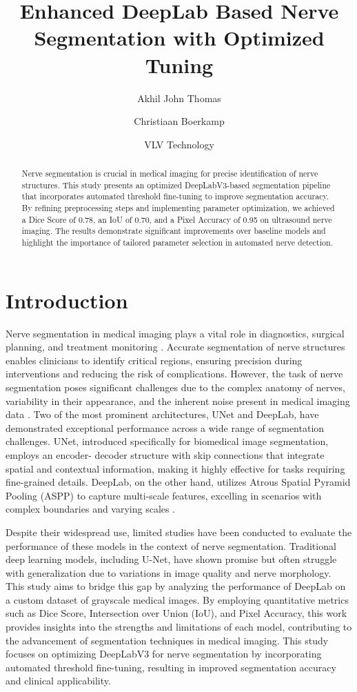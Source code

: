 \documentclass{article}
\title{Enhanced DeepLab Based Nerve Segmentation with Optimized Tuning}
\author{Akhil John Thomas \and  Christiaan Boerkamp}
\date{VLV Technology}
\begin{document}
\maketitle

\begin{abstract}
Nerve segmentation is crucial in medical imaging for precise identification of nerve structures. This study presents an optimized DeepLabV3-based segmentation pipeline that incorporates automated threshold fine-tuning to improve segmentation accuracy. By refining preprocessing steps and implementing parameter optimization, we achieved a Dice Score of 0.78, an IoU of 0.70, and a Pixel Accuracy of 0.95 on ultrasound nerve imaging. The results demonstrate significant improvements over baseline models and highlight the importance of tailored parameter selection in automated nerve detection.
\end{abstract}


\section{Introduction}

Nerve segmentation in medical imaging plays a vital role in diagnostics, surgical planning, and treatment monitoring \cite{egger2012medical}. Accurate segmentation of nerve structures enables clinicians to identify critical regions, ensuring precision during interventions and reducing the risk of complications. However, the task of nerve segmentation poses significant challenges due to the complex anatomy of nerves, variability in their appearance, and the inherent noise present in medical imaging data \cite{ronneberger2015u}\cite{milletari2016v}. Two of the most prominent architectures, UNet and DeepLab, have demonstrated
exceptional performance across a wide range of segmentation challenges. UNet,
introduced specifically for biomedical image segmentation, employs an encoder-
decoder structure with skip connections that integrate spatial and contextual information, making it highly effective for tasks requiring fine-grained details.
DeepLab, on the other hand, utilizes Atrous Spatial Pyramid Pooling (ASPP) to capture multi-scale features, excelling in scenarios with complex boundaries and varying scales \cite{chen2018encoder}.


Despite their widespread use, limited studies have been conducted to evaluate the performance of these models in the context of nerve segmentation. Traditional deep learning models, including U-Net, have shown promise but often struggle with generalization due to variations in image quality and nerve morphology. This study aims to bridge this gap by analyzing the performance of DeepLab on a custom dataset of grayscale medical images. By employing quantitative metrics such as Dice Score, Intersection over Union (IoU), and Pixel Accuracy, this work provides insights into the strengths
and limitations of each model, contributing to the advancement of segmentation techniques in medical imaging. This study focuses on optimizing DeepLabV3 for nerve segmentation by incorporating automated threshold fine-tuning, resulting in improved segmentation accuracy and clinical applicability.
\end{document}
